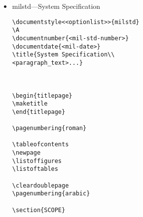\begin{itemize}
\begin{small}
\begin{verbatim}
<<pre_commands>>...

\title{<text>}
\author{<name>}
\department{<department>}
\submissiondate{<date>}
\degree{<degree>}
\faculty{<faculty>}
\institution{<institution>}
\thesis{<thesis>}
\ded{<dedication>}



\maketitle{y}{y}{}
%
%You must have the abstract in a file called ABSTRACT.TEX
%
\chapter{<text>}
<text>
\section{<text>}
<text>
\subsection{<text>}
<text>
\subsubsection{<text>}
<text>

\end{verbatim}
\end{small}

\item milstd---System Specification

\begin{small}
\begin{verbatim}
\documentstyle<<optionlist>>{milstd}
\A
\documentnumber{<mil-std-number>}
\documentdate{<mil-date>}
\title{System Specification\\
<paragraph_text>...}



\begin{titlepage}
\maketitle
\end{titlepage}

\pagenumbering{roman}

\tableofcontents
\newpage
\listoffigures
\listoftables

\cleardoublepage
\pagenumbering{arabic}

\section{SCOPE}


\end{verbatim}
\end{small}
\end{itemize}
